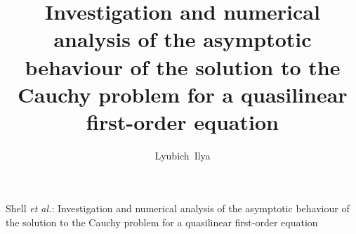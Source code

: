 \documentclass[journal]{IEEEtran}
\begin{document}
%
\title{Investigation and numerical analysis of the asymptotic behaviour of the solution to the Cauchy problem for a quasilinear first-order equation}
%
%
%

\author{Lyubich~Ilya}%


% 
%



%
{Shell \MakeLowercase{\textit{et al.}}: Investigation and numerical analysis of the asymptotic behaviour of the solution to the Cauchy problem for a quasilinear first-order equation}
% 
\end{document}
